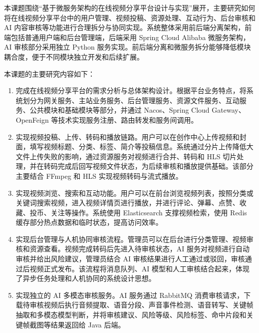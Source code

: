 本课题围绕“基于微服务架构的在线视频分享平台设计与实现”展开，主要研究如何将在线视频分享平台中的用户管理、视频投稿、资源处理、互动行为、后台审核和 AI 内容审核等功能进行合理拆分与协同实现。系统整体采用前后端分离架构，前端包括普通用户端和后台管理端，后端采用 Spring Cloud Alibaba 微服务架构，AI 审核部分采用独立 Python 服务实现。前后端分离和微服务拆分能够降低模块耦合度，便于不同模块独立开发和后续扩展\cite{lewis2014microservices,newman2021building,richardson2018microservices,vueguide,viteguide,vuerouterdocs,piniadocs,axiosdocs}。

本课题的主要研究内容如下：

\begin{enumerate}
  \item 完成在线视频分享平台的需求分析与总体架构设计。根据平台业务特点，将系统划分为网关服务、主站业务服务、后台管理服务、资源文件服务、互动服务、公共模块和基础模块等部分，并通过 Nacos、Spring Cloud Gateway、OpenFeign 等技术实现服务注册、路由转发和服务间调用\cite{springclouddocs,springgatewaydocs,springopenfeign,nacosdocs}。
  
  \item 实现视频投稿、上传、转码和播放链路。用户可以在创作中心上传视频和封面，填写视频标题、分类、标签、简介等投稿信息。系统通过分片上传降低大文件上传失败的影响，通过资源服务对视频进行合并、转码和 HLS 切片处理，并在转码完成后回写视频文件状态，为后续审核和播放提供基础。该部分主要结合 FFmpeg 和 HLS 实现视频转码与流式播放\cite{ffmpegdocs,rfc8216hls,whatwgvideo,mdnvideoaudio}。
  
  \item 实现视频浏览、搜索和互动功能。用户可以在前台浏览视频列表，按照分类或关键词搜索视频，进入视频详情页进行播放，并进行评论、弹幕、点赞、收藏、投币、关注等操作。系统使用 Elasticsearch 支撑视频检索，使用 Redis 缓存部分热点数据和临时状态，提高访问效率\cite{redisdocs,elasticsearchdocs}。
  
  \item 实现后台管理与人机协同审核流程。管理员可以在后台进行分类管理、视频审核和资源查看。视频完成转码后先进入待审核状态，AI 服务对视频进行自动审核并给出风险建议，管理员结合 AI 审核结果进行人工通过或驳回，审核通过后视频正式发布。该流程将消息队列、AI 模型和人工审核结合起来，体现了异步任务处理和人机协同的系统设计思想\cite{rabbitmqdocs,radford2023whisper,gemmeke2017audioset,hershey2017cnn,tensorflow2024yamnet,bai2023qwen}。
  
  \item 实现独立的 AI 多模态审核服务。AI 服务通过 RabbitMQ 消费审核请求，下载待审核视频后执行音频提取、语音分段、声音事件检测、语音转写、关键帧抽取和多模态模型判断，并将审核建议、风险等级、风险标签、命中片段和关键帧截图等结果返回给 Java 后端\cite{radford2023whisper,gemmeke2017audioset,hershey2017cnn,tensorflow2024yamnet,bai2023qwen,silerovad,fastapidocs,uvicorndocs,pikadocs}。
\end{enumerate}

